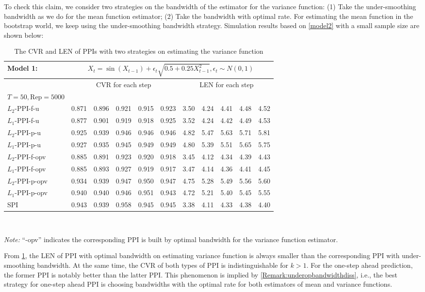 \documentclass[a4paper]{article}
\begin{document}
To check this claim, we consider two strategies on the bandwidth of the estimator for the variance function: (1) Take the under-smoothing bandwidth as we do for the mean function estimator; (2) Take the bandwidth with optimal rate. For estimating the mean function in the bootstrap world, we keep using the under-smoothing bandwidth strategy. Simulation results based on \cref{model2} with a small sample size are shown below:
\begin{table}[htbp]
\centering
  \caption{The CVR and LEN of PPIs with two strategies on estimating the variance function}
  \vspace{2pt}
  \label{Tab:model2PPIcompare_opvariance}
\begin{tabular}{lcccccccccc}
  \toprule 
 Model 1: & \multicolumn{10}{c}{$X_t = \sin(X_{t-1}) + \epsilon_t\sqrt{0.5 + 0.25X_{t-1}^2}, \epsilon_t\sim N(0,1)$} \\
 \midrule
  & \multicolumn{5}{c}{CVR for each step} & \multicolumn{5}{c}{LEN for each step}\\
    $T = 50, \text{Rep} = 5000$        &       &       &       &       &  \\[3pt]
  $L_2$-PPI-f-u & 0.871 & 0.896 & 0.921 & 0.915 & 0.923 & 3.50 & 4.24 & 4.41 & 4.48 & 4.52  \\ 
  $L_1$-PPI-f-u & 0.877 & 0.901 & 0.919 & 0.918 & 0.925 & 3.52 & 4.24 & 4.42 & 4.49 & 4.53\\ 
  $L_2$-PPI-p-u & 0.925 & 0.939 & 0.946 & 0.946 & 0.946 & 4.82 & 5.47 & 5.63 & 5.71 & 5.81  \\ 
  $L_1$-PPI-p-u & 0.927 & 0.935 & 0.945 & 0.949 & 0.949& 4.80 & 5.39 & 5.51 & 5.65 & 5.75  \\ 
  $L_2$-PPI-f-opv & 0.885 & 0.891 & 0.923 & 0.920 & 0.918 & 3.45 & 4.12 & 4.34 & 4.39 & 4.43\\ 
  $L_1$-PPI-f-opv  & 0.885 & 0.893 & 0.927 & 0.919 & 0.917 & 3.47 & 4.14 & 4.36 & 4.41 & 4.45  \\ 
  $L_2$-PPI-p-opv & 0.934 & 0.939 & 0.947 & 0.950 & 0.947& 4.75 & 5.28 & 5.49 & 5.56 & 5.60   \\ 
  $L_1$-PPI-p-opv& 0.940 & 0.940 & 0.946 & 0.951 & 0.943 & 4.72 & 5.21 & 5.40 & 5.45 & 5.55 \\ 
  SPI & 0.943 & 0.939 & 0.958 & 0.945 & 0.945 & 3.38 & 4.11 & 4.33 & 4.38 & 4.40 \\ 
       \bottomrule
    \end{tabular}\\
      \raggedright
     \textit{Note:}  ``-opv'' indicates the corresponding PPI is built by  optimal bandwidth for the variance function estimator. 
\end{table}

From \cref{Tab:model2PPIcompare_opvariance}, the LEN of PPI with optimal bandwidth on estimating variance function is always smaller than the corresponding PPI with under-smoothing bandwidth. At the same time, the CVR of both types of PPI is indistinguishable for $k>1$. For the one-step ahead prediction, the former PPI is notably better than the latter PPI. This phenomenon is implied by \cref{Remark:underopbandwidthdiss}, i.e., the best strategy for one-step ahead PPI is choosing bandwidths with the optimal rate for both estimators of mean and variance functions.
\end{document}

